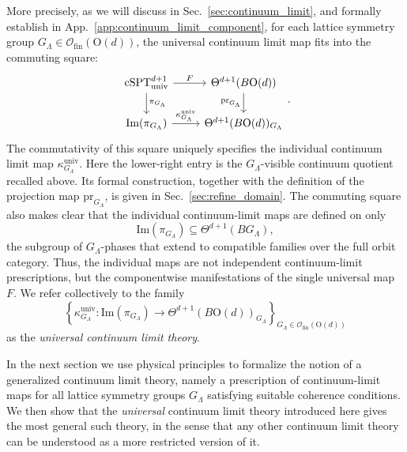 \documentclass[aps,prx,reprint,superscriptaddress,twocolumn,amsmath,amssymb,amsfonts, nofootinbib]{revtex4-2}
\newcommand{\csptu}{\mathrm{cSPT}^{d+1}_{\mathrm{univ}}}
\newcommand{\ofin}{\mathcal{O}_{\text{fin}}}
\theoremstyle{apsstyle}
\begin{document}
More precisely, as we will discuss in Sec.~\ref{sec:continuum_limit}, and formally establish in App.~\ref{app:continuum_limit_component}, for each lattice symmetry group $G_{\Lambda}\in\ofin(\mathrm{O}(d))$, the universal continuum limit map fits into the commuting square:
\begin{equation}
\label{eq:square_factorization}
    \begin{tikzcd}
        \csptu \arrow[r, "F"] \arrow[d, "\pi_{G_{\Lambda}}"] &\Theta^{d+1}(B\mathrm{O}(d)) \arrow[d, "\mathrm{pr}_{G_{\Lambda}}"']\\
        \mathrm{Im}(\pi_{G_{\Lambda}}) \arrow[r, "\kappa^{\mathrm{univ}}_{G_{\Lambda}}"] &\Theta^{d+1}(B\mathrm{O}(d))_{G_{\Lambda}}
    \end{tikzcd}.
\end{equation}
The commutativity of this square uniquely specifies the individual continuum limit map $\kappa^{\mathrm{univ}}_{G_{\Lambda}}$. Here the lower-right entry is the $G_{\Lambda}$-visible continuum quotient recalled above. Its formal construction, together with the definition of the projection map $\mathrm{pr}_{G_{\Lambda}}$, is given in Sec.~\ref{sec:refine_domain}. The commuting square also makes clear that the individual continuum-limit maps are defined on only
\begin{equation*}
\mathrm{Im}(\pi_{G_{\Lambda}}) \subseteq \Theta^{d+1}(BG_{\Lambda}),
\end{equation*}
the subgroup of $G_{\Lambda}$-phases that extend to compatible families over the full orbit category. Thus, the individual maps are not independent continuum-limit prescriptions, but the componentwise manifestations of the single universal map $F$. We refer collectively to the family
\begin{equation*}
\left\{
\kappa_{G_{\Lambda}}^{\mathrm{univ}}:
\mathrm{Im}(\pi_{G_{\Lambda}})
\longrightarrow
\Theta^{d+1}(B\mathrm{O}(d))_{G_{\Lambda}}
\right\}_{G_{\Lambda}\in\ofin(\mathrm{O}(d))}
\end{equation*}
as the \textit{universal continuum limit theory}.



\bigskip 

In the next section we use physical principles to formalize the notion of a generalized continuum limit theory, namely a prescription of continuum-limit maps for all lattice symmetry groups $G_{\Lambda}$ satisfying suitable coherence conditions. We then show that the \emph{universal} continuum limit theory introduced here gives the most general such theory, in the sense that any other continuum limit theory can be understood as a more restricted version of it.
\end{document}
